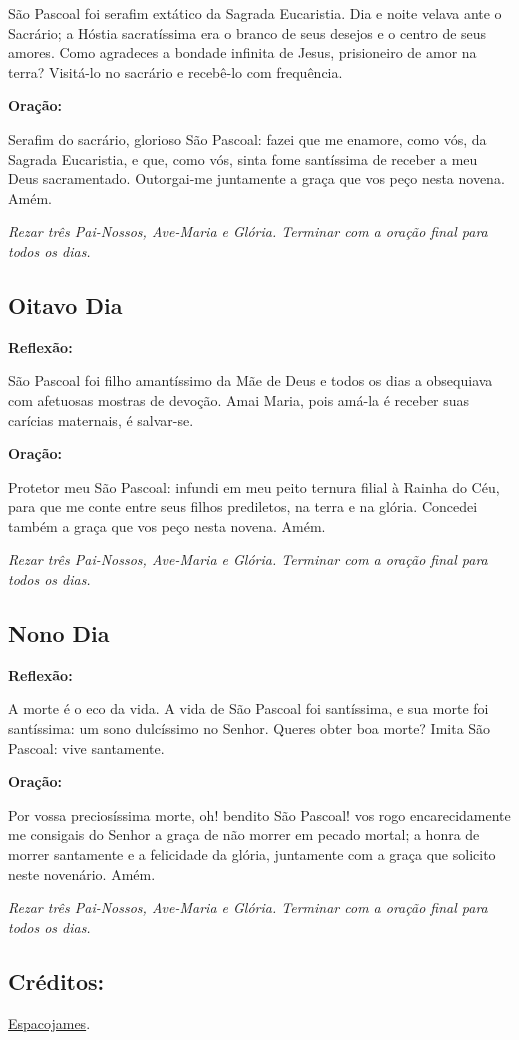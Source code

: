 \documentclass[18pt]{article}
\begin{document}
São Pascoal foi serafim extático da Sagrada Eucaristia. Dia e noite velava ante o Sacrário; a Hóstia sacratíssima era o branco de seus desejos e o centro de seus amores. Como agradeces a bondade infinita de Jesus, prisioneiro de amor na terra? Visitá-lo no sacrário e recebê-lo com frequência.

\textbf{Oração:}

Serafim do sacrário, glorioso São Pascoal: fazei que me enamore, como vós, da Sagrada Eucaristia, e que, como vós, sinta fome santíssima de receber a meu Deus sacramentado. Outorgai-me juntamente a graça que vos peço nesta novena. Amém.

\textit{Rezar três Pai-Nossos, Ave-Maria e Glória. Terminar com a oração final para todos os dias.}

\subsection*{Oitavo Dia}
\textbf{Reflexão:}

São Pascoal foi filho amantíssimo da Mãe de Deus e todos os dias a obsequiava com afetuosas mostras de devoção. Amai Maria, pois amá-la é receber suas carícias maternais, é salvar-se.

\textbf{Oração:}

Protetor meu São Pascoal: infundi em meu peito ternura filial à Rainha do Céu, para que me conte entre seus filhos prediletos, na terra e na glória. Concedei também a graça que vos peço nesta novena. Amém.

\textit{Rezar três Pai-Nossos, Ave-Maria e Glória. Terminar com a oração final para todos os dias.}

\subsection*{Nono Dia}
\textbf{Reflexão:}

A morte é o eco da vida. A vida de São Pascoal foi santíssima, e sua morte foi santíssima: um sono dulcíssimo no Senhor. Queres obter boa morte? Imita São Pascoal: vive santamente.

\textbf{Oração:}

Por vossa preciosíssima morte, oh! bendito São Pascoal! vos rogo encarecidamente me consigais do Senhor a graça de não morrer em pecado mortal; a honra de morrer santamente e a felicidade da glória, juntamente com a graça que solicito neste novenário. Amém.

\textit{Rezar três Pai-Nossos, Ave-Maria e Glória. Terminar com a oração final para todos os dias.}

\vfill

\subsection*{Créditos:}
\href{https://www.espacojames.com.br/?cat=54&id=1473}{Espacojames}.
\end{document}
